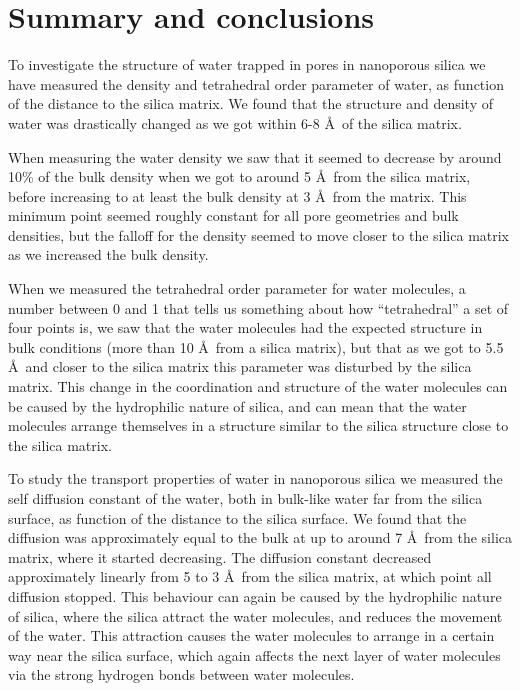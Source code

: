 \chapter{Summary and conclusions}
To investigate the structure of water trapped in pores in nanoporous silica we have measured the density and tetrahedral order parameter of water, as function of the distance to the silica matrix. We found that the structure and density of water was drastically changed as we got within 6-8 \AA\ of the silica matrix.

When measuring the water density we saw that it seemed to decrease by around 10\% of the bulk density when we got to around 5 \AA\ from the silica matrix, before increasing to at least the bulk density at 3 \AA\ from the matrix. This minimum point seemed roughly constant for all pore geometries and bulk densities, but the falloff for the density seemed to move closer to the silica matrix as we increased the bulk density.

When we measured the tetrahedral order parameter for water molecules, a number between 0 and 1 that tells us something about how ``tetrahedral'' a set of four points is, we saw that the water molecules had the expected structure in bulk conditions (more than 10 \AA\ from a silica matrix), but that as we got to 5.5 \AA\ and closer to the silica matrix this parameter was disturbed by the silica matrix. This change in the coordination and structure of the water molecules can be caused by the hydrophilic nature of silica, and can mean that the water molecules arrange themselves in a structure similar to the silica structure close to the silica matrix.

To study the transport properties of water in nanoporous silica we measured the self diffusion constant of the water, both in bulk-like water far from the silica surface, as function of the distance to the silica surface. We found that the diffusion was approximately equal to the bulk at up to around 7 \AA\ from the silica matrix, where it started decreasing. The diffusion constant decreased approximately linearly from 5 to 3 \AA\ from the silica matrix, at which point all diffusion stopped. This behaviour can again be caused by the hydrophilic nature of silica, where the silica attract the water molecules, and reduces the movement of the water. This attraction causes the water molecules to arrange in a certain way near the silica surface, which again affects the next layer of water molecules via the strong hydrogen bonds between water molecules.

